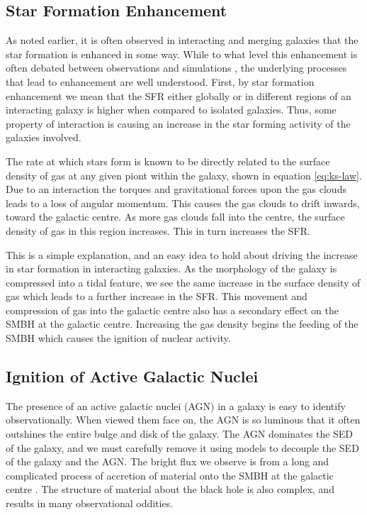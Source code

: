 \subsection{Star Formation Enhancement} 
\noindent As noted earlier, it is often observed in interacting and merging galaxies that the star formation is enhanced in some way. While to what level this enhancement is often debated between observations \citep{2003ApJ...582..668B, 2008MNRAS.385.1903L, 2011MNRAS.412..591P, 2022ApJS..261...34H} and simulations \citep{2007A&A...468...61D, 2008MNRAS.384..386C, 2013MNRAS.430.1901H, 2021MNRAS.503.3113M}, the underlying processes that lead to enhancement are well understood. First, by star formation enhancement we mean that the SFR either globally or in different regions of an interacting galaxy is higher when compared to isolated galaxies. Thus, some property of interaction is causing an increase in the star forming activity of the galaxies involved. 

The rate at which stars form is known to be directly related to the surface density of gas at any given piont within the galaxy, shown in equation \ref{eq:ks-law}. Due to an interaction the torques and gravitational forces upon the gas clouds leads to a loss of angular momentum. This causes the gas clouds to drift inwards, toward the galactic centre. As more gas clouds fall into the centre, the surface density of gas in this region increases. This in turn increases the SFR.

This is a simple explanation, and an easy idea to hold about driving the increase in star formation in interacting galaxies. As the morphology of the galaxy is compressed into a tidal feature, we see the same increase in the surface density of gas which leads to a further increase in the SFR. This movement and compression of gas into the galactic centre also has a secondary effect on the SMBH at the galactic centre. Increasing the gas density begins the feeding of the SMBH which causes the ignition of nuclear activity.

\subsection{Ignition of Active Galactic Nuclei}
\noindent The presence of an active galactic nuclei (AGN) in a galaxy is easy to identify observationally. When viewed them face on, the AGN is so luminous that it often outshines the entire bulge and disk of the galaxy. The AGN dominates the SED of the galaxy, and we must carefully remove it using models to decouple the SED of the galaxy and the AGN. The bright flux we observe is from a long and complicated process of accretion of material onto the SMBH at the galactic centre \citep[for an excellent breakdown of the structure and evolution of AGN see][]{2012agn..book.....B}. The structure of material about the black hole is also complex, and results in many observational oddities. 

